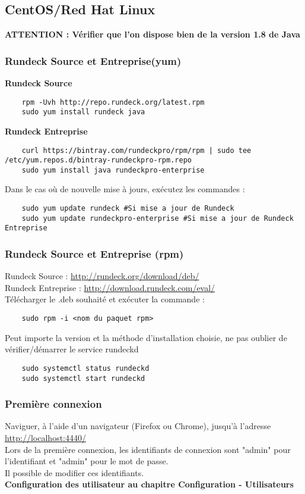 \documentclass[12pt]{article}
\begin{document}
\subsection{CentOS/Red Hat Linux}
\textbf{ATTENTION : Vérifier que l'on dispose bien de la version 1.8 de Java}

\subsubsection{Rundeck Source et Entreprise(yum)}
\textbf{Rundeck Source}
\begin{lstlisting}
    rpm -Uvh http://repo.rundeck.org/latest.rpm
    sudo yum install rundeck java
\end{lstlisting}

\textbf{Rundeck Entreprise}
\begin{lstlisting}
    curl https://bintray.com/rundeckpro/rpm/rpm | sudo tee /etc/yum.repos.d/bintray-rundeckpro-rpm.repo
    sudo yum install java rundeckpro-enterprise
\end{lstlisting}

Dans le cas où de nouvelle mise à jours, exécutez les commandes :
\begin{lstlisting}
    sudo yum update rundeck #Si mise a jour de Rundeck
    sudo yum update rundeckpro-enterprise #Si mise a jour de Rundeck Entreprise
\end{lstlisting}

\subsubsection{Rundeck Source et Entreprise (rpm)}
Rundeck Source : \url{http://rundeck.org/download/deb/}
\\
Rundeck Entreprise : \url{http://download.rundeck.com/eval/} 
\\
Télécharger le .deb souhaité et exécuter la commande : 
\begin{lstlisting}
    sudo rpm -i <nom du paquet rpm>
\end{lstlisting}

Peut importe la version et la méthode d'installation choisie, ne pas oublier de vérifier/démarrer le service rundeckd
\begin{lstlisting}
    sudo systemctl status rundeckd
    sudo systemctl start rundeckd
\end{lstlisting}

\subsubsection{Première connexion}
Naviguer, à l'aide d'un navigateur (Firefox ou Chrome), jusqu'à l'adresse \url{ http://localhost:4440/}
\\
Lors de la première connexion, les identifiants de connexion sont "admin" pour l'identifiant et "admin" pour le mot de passe.
\\
Il possible de modifier ces identifiants.
\vspace{0.5cm}
\\
\textbf{Configuration des utilisateur au chapitre Configuration - Utilisateurs}
\end{document}
